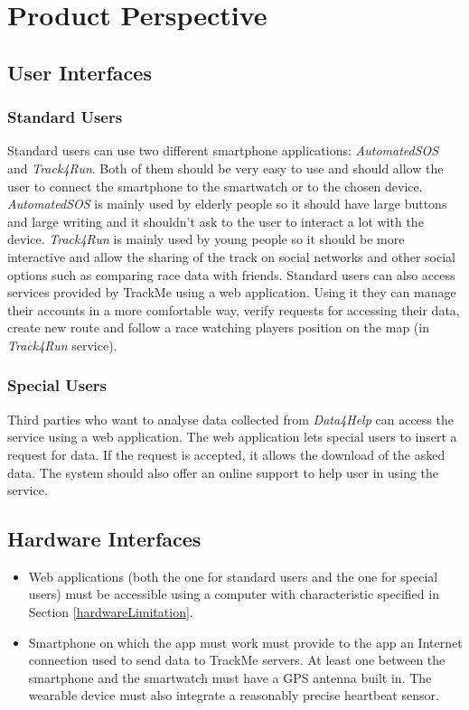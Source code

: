 \section{Product Perspective}

\subsection{User Interfaces}

\subsubsection{Standard Users}
Standard users can use two different smartphone applications: \textit{AutomatedSOS} and \textit{Track4Run}.
Both of them should be very easy to use and should allow the user to connect the smartphone to the smartwatch or to the chosen device.
\textit{AutomatedSOS} is mainly used by elderly people so it should have large buttons and large writing and it shouldn't ask to the user to interact a lot with the device.
\textit{Track4Run} is mainly used by young people so it should be more interactive and allow the sharing of the track on social networks and other social options such as comparing race data with friends.
Standard users can also access services provided by TrackMe using a web application. Using it they can manage their accounts in a more comfortable way, verify requests for accessing their data, create new route and follow a race watching players position on the map (in \textit{Track4Run} service).

\subsubsection{Special Users}
Third parties who want to analyse data collected from \textit{Data4Help} can access the service using a web application.
The web application lets special users to insert a request for data.
If the request is accepted, it allows the download of the asked data.
The system should also offer an online support to help user in using the service.

\subsection{Hardware Interfaces}\label{hardwareInterfaces}
\begin{itemize}
\item Web applications (both the one for standard users and the one for special users) must be accessible using a computer with characteristic specified in Section \ref{hardwareLimitation}.
\item Smartphone on which the app must work must provide to the app an Internet connection used to send data to TrackMe servers.
At least one between the smartphone and the smartwatch must have a GPS antenna built in.
The wearable device must also integrate a reasonably precise heartbeat sensor.
\end{itemize}

